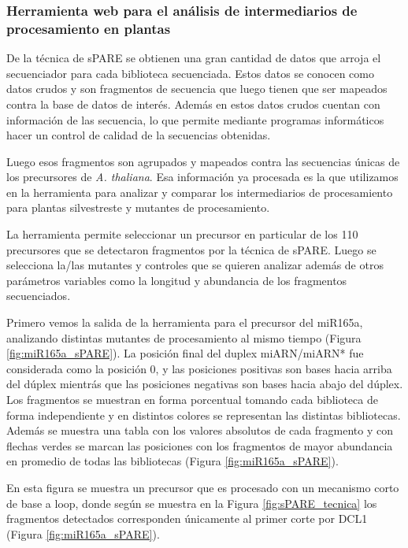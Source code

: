 

\subsubsection{Herramienta web para el análisis de intermediarios de procesamiento en plantas}
De la técnica de sPARE se obtienen una gran cantidad de datos que arroja el secuenciador para cada biblioteca secuenciada.
Estos datos se conocen como datos crudos y son fragmentos de secuencia que luego tienen que ser mapeados contra la base de datos de interés.
Además en estos datos crudos cuentan con  información de las secuencia, lo que permite mediante programas informáticos hacer un control de calidad de la secuencias obtenidas.

Luego esos fragmentos son agrupados y mapeados contra las secuencias únicas de los precursores de \textit{A. thaliana}.
Esa información ya procesada es la que utilizamos en la herramienta para analizar y comparar los intermediarios de procesamiento para plantas silvestreste y mutantes de procesamiento.

La herramienta permite seleccionar un precursor en particular de los 110 precursores que se detectaron fragmentos por la técnica de sPARE.
Luego se selecciona la/las mutantes y controles que se quieren analizar además de otros parámetros variables como la longitud y abundancia de los fragmentos secuenciados.

Primero vemos la salida de la herramienta para el precursor del  miR165a, analizando distintas mutantes de procesamiento al mismo tiempo (Figura \ref{fig:miR165a_sPARE}).
La posición final del duplex miARN/miARN* fue considerada como la posición 0, y las posiciones positivas son bases hacia arriba del dúplex mientrás que las posiciones negativas son bases hacia abajo del dúplex.
Los fragmentos se muestran en forma porcentual tomando cada biblioteca de forma independiente y en distintos colores se representan las distintas bibliotecas.
Además se muestra una tabla con los valores absolutos de cada fragmento y con flechas verdes se marcan las posiciones con los fragmentos de mayor abundancia en promedio de todas las bibliotecas (Figura \ref{fig:miR165a_sPARE}).
 
En esta figura se muestra un precursor que es procesado con un mecanismo corto de base a loop, donde según se muestra en la Figura \ref{fig:sPARE_tecnica} los fragmentos detectados corresponden únicamente al primer corte por DCL1 (Figura \ref{fig:miR165a_sPARE}).

